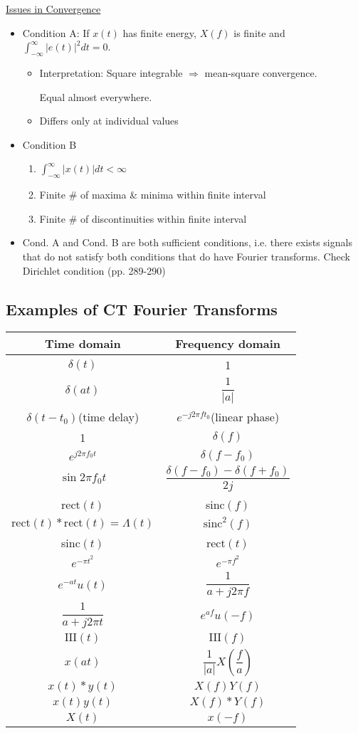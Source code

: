 \documentclass{article}
\begin{document}
\underline{Issues in Convergence}
\begin{itemize}
\item Condition A: If $x(t)$ has finite energy, $X(f)$ is finite and $\displaystyle\int_{-\infty}^{\infty}{|e(t)|^2dt}=0$.
\begin{itemize}
\item Interpretation: Square integrable $\Rightarrow$ mean-square convergence.

Equal almost everywhere.
\item Differs only at individual values
\end{itemize}
\item Condition B
\begin{enumerate}
\item $\displaystyle\int_{-\infty}^{\infty}{|x(t)|dt}<\infty$
\item Finite \# of maxima \& minima within finite interval
\item Finite \# of discontinuities within finite interval
\end{enumerate}
\item Cond. A and Cond. B are both sufficient conditions, i.e. there exists signals that do not satisfy both conditions that do have Fourier transforms. Check Dirichlet condition (pp. 289-290)
\end{itemize}
\subsection{Examples of CT Fourier Transforms}
\begin{center}
\begin{tabular}{c|c}
Time domain & Frequency domain \\
\hline
$\delta(t)$ & 1\\
$\delta(at)$ & $\dfrac{1}{|a|}$\\
$\delta(t-t_0)$(time delay) & $e^{-j2\pi ft_0}$(linear phase)\\
1 & $\delta(f)$\\
$e^{j2\pi f_0t}$ & $\delta(f-f_0)$\\
$\sin{2\pi f_0t}$ & $\dfrac{\delta(f-f_0)-\delta(f+f_0)}{2j}$\\
\hline
rect$(t)$ & sinc$(f)$\\
$\mathrm{rect}(t)*\mathrm{rect}(t)=\Lambda(t)$ & $\mathrm{sinc}^2(f)$\\
sinc$(t)$ & rect$(t)$\\
$e^{-\pi t^2}$ & $e^{-\pi f^2}$\\
\hline
$e^{-at}u(t)$ & $\dfrac{1}{a+j2\pi f}$\\
$\dfrac{1}{a+j2\pi t}$ & $e^{af}u(-f)$\\
$\mathrm{III}(t)$ & $\mathrm{III}(f)$\\
$x(at)$ & $\dfrac{1}{|a|}X(\dfrac{f}{a})$\\
\hline
$x(t)*y(t)$ & $X(f)Y(f)$\\
$x(t)y(t)$ & $X(f)*Y(f)$\\
$X(t)$ & $x(-f)$
\end{tabular}
\end{center}
\end{document}
